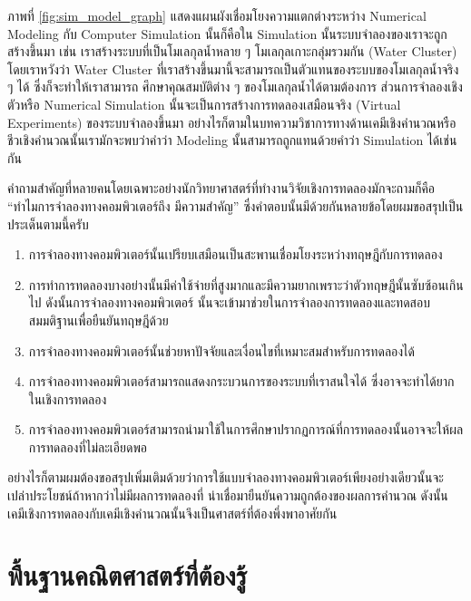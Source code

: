 ภาพที่ \ref{fig:sim_model_graph} แสดงแผนผังเชื่อมโยงความแตกต่างระหว่าง Numerical Modeling กับ Computer Simulation
นั้นก็คือใน Simulation นั้นระบบจำลองของเราจะถูกสร้างขึ้นมา เช่น เราสร้างระบบที่เป็นโมเลกุลน้ำหลาย ๆ โมเลกุลเกาะกลุ่มรวมกัน (Water
Cluster) โดยเราหวังว่า Water Cluster ที่เราสร้างขึ้นมานี้จะสามารถเป็นตัวแทนของระบบของโมเลกุลน้ำจริง ๆ ได้ ซึ่งก็จะทำให้เราสามารถ%
ศึกษาคุณสมบัติต่าง ๆ ของโมเลกุลน้ำได้ตามต้องการ ส่วนการจำลองเชิงตัวหรือ Numerical Simulation นั้นจะเป็นการสร้างการทดลองเสมือนจริง
(Virtual Experiments) ของระบบจำลองขึ้นมา อย่างไรก็ตามในบทความวิชาการทางด้านเคมีเชิงคำนวณหรือชีวเชิงคำนวณนั้นเรามักจะพบว่าคำว่า
Modeling นั้นสามารถถูกแทนด้วยคำว่า Simulation ได้เช่นกัน

คำถามสำคัญที่หลายคนโดยเฉพาะอย่างนักวิทยาศาสตร์ที่ทำงานวิจัยเชิงการทดลองมักจะถามก็คือ \enquote{ทำไมการจำลองทางคอมพิวเตอร์ถึง%
  มีความสำคัญ} ซึ่งคำตอบนั้นมีด้วยกันหลายข้อโดยผมขอสรุปเป็นประเด็นตามนี้ครับ

\begin{enumerate}[topsep=0pt,noitemsep]
  \setlength\itemsep{1em}
  \item การจำลองทางคอมพิวเตอร์นั้นเปรียบเสมือนเป็นสะพานเชื่อมโยงระหว่างทฤษฎีกับการทดลอง

  \item การทำการทดลองบางอย่างนั้นมีค่าใช้จ่ายที่สูงมากและมีความยากเพราะว่าตัวทฤษฎีนั้นซับซ้อนเกินไป ดังนั้นการจำลองทางคอมพิวเตอร์%
        นั้นจะเข้ามาช่วยในการจำลองการทดลองและทดสอบสมมติฐานเพื่อยืนยันทฤษฎีด้วย

  \item การจำลองทางคอมพิวเตอร์นั้นช่วยหาปัจจัยและเงื่อนไขที่เหมาะสมสำหรับการทดลองได้

  \item การจำลองทางคอมพิวเตอร์สามารถแสดงกระบวนการของระบบที่เราสนใจได้ ซึ่งอาจจะทำได้ยากในเชิงการทดลอง

  \item การจำลองทางคอมพิวเตอร์สามารถนำมาใช้ในการศึกษาปรากฏการณ์ที่การทดลองนั้นอาจจะให้ผลการทดลองที่ไม่ละเอียดพอ
\end{enumerate}

อย่างไรก็ตามผมต้องขอสรุปเพิ่มเติมด้วยว่าการใช้แบบจำลองทางคอมพิวเตอร์เพียงอย่างเดียวนั้นจะเปล่าประโยชน์ถ้าหากว่าไม่มีผลการทดลองที่%
น่าเชื่อมายืนยันความถูกต้องของผลการคำนวณ ดังนั้นเคมีเชิงการทดลองกับเคมีเชิงคำนวณนั้นจึงเป็นศาสตร์ที่ต้องพึ่งพาอาศัยกัน

\section{พื้นฐานคณิตศาสตร์ที่ต้องรู้}

